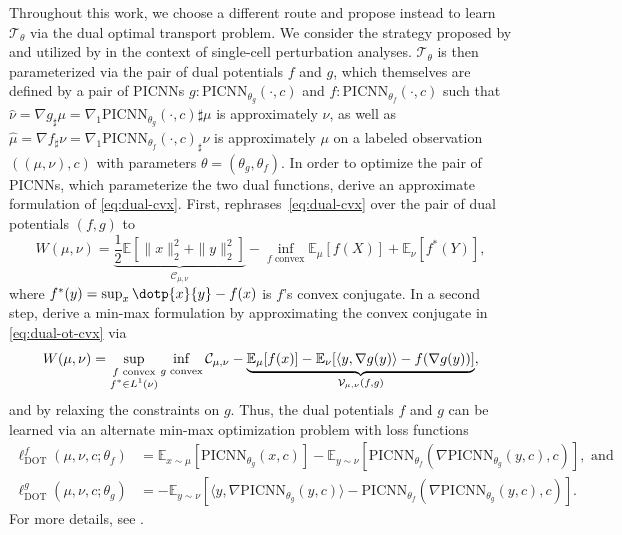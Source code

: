Throughout this work, we choose a different route and propose instead to learn $\mathcal{T}_{\theta}$ via the dual optimal transport problem. We consider the strategy proposed by \citet{makkuva2020optimal} and utilized by \citet{bunne2021learning} in the context of single-cell perturbation analyses.
 $\mathcal{T}_{\theta}$ is then parameterized via the pair of dual potentials $f$ and $g$, which  themselves are defined by a pair of PICNNs $g:\text{PICNN}_{\theta_g}(\cdot,c)$ and $f:\text{PICNN}_{\theta_f}(\cdot,c)$ such that $\hat{\nu} = \nabla g _\sharp \mu = \nabla_1 \text{PICNN}_{\theta_g} (\cdot,c)\sharp \mu$ is approximately $\nu$, as well as $\hat{\mu} = \nabla f _\sharp \nu = \nabla_1 \text{PICNN}_{\theta_f} (\cdot, c)_\sharp\nu$ is approximately $\mu$ on a labeled observation $((\mu,\nu),c)$ with parameters $\theta = (\theta_g, \theta_f)$.
In order to optimize the pair of PICNNs, which parameterize the two dual functions, \citet{makkuva2020optimal} derive an approximate formulation of \eqref{eq:dual-cvx}.
First, \citet[Theorem 2.9]{villani2021topics} rephrases~\eqref{eq:dual-cvx} over the pair of dual potentials $(f, g)$ to
\begin{equation} \label{eq:dual-ot-cvx}
    W(\mu, \nu)= \underbrace{\frac{1}{2}\mathbb{E}\left[\|x\|_{2}^{2}+\|y\|_{2}^{2}\right]}_{\mathcal{C}_{\mu, \nu}}-\inf _{f \text{ convex}} \mathbb{E}_{\mu}[f(X)]+\mathbb{E}_{\nu}\left[f^{*}(Y)\right],
\end{equation}
where $f^*(y) = \sup_x \dotp{x}{y} - f(x)$ is $f$'s convex conjugate.
In a second step, \citet{makkuva2020optimal} derive a min-max formulation by approximating the convex conjugate in \eqref{eq:dual-ot-cvx} via
\begin{equation} \label{eq:ot-minmax}
    W(\mu, \nu)=\sup _{\substack{f  \text{ convex} \\ f^{*} \in L^{1}(\nu)}} \newinf _{g \text{ convex}}  \mathcal{C}_{\mu, \nu} - \underbrace{\mathbb{E}_{\mu}[f(x)]-\mathbb{E}_{\nu}[\langle y, \nabla g(y)\rangle-f(\nabla g(y))]}_{\mathcal{V}_{\mu, \nu}(f, g)},
\end{equation}
and by relaxing the constraints on $g$. 
Thus, the dual potentials $f$ and $g$ can be learned via an alternate min-max optimization problem with loss functions
\begin{align} 
    \ell_\text{DOT}^f(\mu, \nu, c; \theta_f) &= \mathbb{E}_{x \sim \mu}[\text{PICNN}_{\theta_g}(x, c)] - \mathbb{E}_{y \sim \nu}[\text{PICNN}_{\theta_f}(\nabla \text{PICNN}_{\theta_g}(y, c), c)], \text{ and }  \label{eq:makkuva_f_loss} \\
    \ell_\text{DOT}^g(\mu, \nu, c; \theta_g) &= -\mathbb{E}_{y \sim \nu}[\langle y, \nabla \text{PICNN}_{\theta_g}(y, c)\rangle-\text{PICNN}_{\theta_f}(\nabla \text{PICNN}_{\theta_g}(y, c), c)]. \label{eq:makkuva_g_loss}
\end{align}
For more details, see \citet{makkuva2020optimal, korotin2021neural}.

